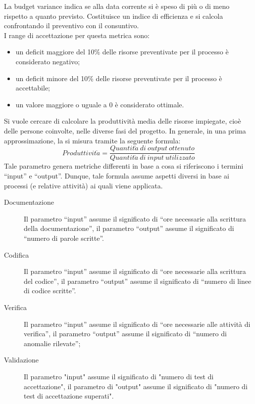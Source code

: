 					La budget variance indica se alla data corrente si è speso di più o di meno rispetto a quanto previsto. Costituisce un indice di efficienza e si calcola confrontando il preventivo con il consuntivo.\\
					I range di accettazione per questa metrica sono:
					\begin{itemize}
					\item un deficit maggiore del 10\% delle risorse preventivate per il processo è considerato negativo;
					\item un deficit minore del 10\% delle risorse preventivate per il processo è accettabile;
					\item un valore maggiore o uguale a 0 è considerato ottimale.
					\end{itemize}
					Si vuole cercare di calcolare la produttività media delle risorse impiegate, cioè delle persone coinvolte, nelle diverse fasi del 
					progetto. In generale, in una prima approssimazione, la si misura tramite la seguente formula:
					\begin{equation} \label{eq:produttivita}						
						Produttivit\grave{a} = \frac{Quantit\grave{a}\ di\ output\ ottenuto}{Quantit\grave{a}\ di\ input\ utilizzato}
					\end{equation}
					Tale parametro genera metriche differenti in base a cosa si riferiscono i termini “input” e “output”. Dunque, tale formula assume 
					aspetti diversi in base ai processi (e relative attività) ai quali viene applicata.
					\begin{description}
						\item[Documentazione] Il parametro “input” assume il significato di “ore necessarie alla scrittura della documentazione”, il parametro “output” assume il significato di “numero di parole scritte”.
						\item[Codifica] Il parametro “input” assume il significato di “ore necessarie alla scrittura del codice”, il parametro “output” assume il significato di “numero di linee di codice scritte”.
						\item[Verifica] Il parametro “input” assume il significato di “ore necessarie alle attività di verifica”, il parametro “output” assume il significato di “numero di anomalie rilevate”;
						\item[Validazione] Il parametro "input" assume il significato di "numero di test di accettazione", il parametro di "output" assume il significato di "numero di test di accettazione superati".
					\end{description}
